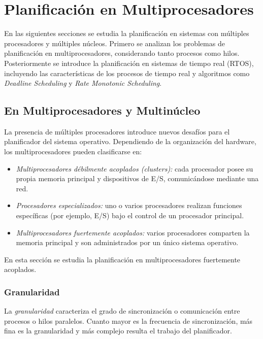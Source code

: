 \section{Planificación en Multiprocesadores}

En las siguientes secciones se estudia la planificación en sistemas con múltiples procesadores y múltiples núcleos. Primero se analizan los problemas de planificación en multiprocesadores, considerando tanto procesos como hilos. Posteriormente se introduce la planificación en sistemas de tiempo real (RTOS), incluyendo las características de los procesos de tiempo real y algoritmos como \textit{Deadline Scheduling} y \textit{Rate Monotonic Scheduling}.

\subsection{En Multiprocesadores y Multinúcleo}

La presencia de múltiples procesadores introduce nuevos desafíos para el planificador del sistema operativo. Dependiendo de la organización del hardware, los multiprocesadores pueden clasificarse en:
\begin{itemize}
  \item \textit{Multiprocesadores débilmente acoplados (clusters):} cada procesador posee su propia memoria principal y dispositivos de E/S, comunicándose mediante una red.
  \item \textit{Procesadores especializados:} uno o varios procesadores realizan funciones específicas (por ejemplo, E/S) bajo el control de un procesador principal.
  \item \textit{Multiprocesadores fuertemente acoplados:} varios procesadores comparten la memoria principal y son administrados por un único sistema operativo.
\end{itemize}

En esta sección se estudia la planificación en multiprocesadores fuertemente acoplados.

\subsubsection{Granularidad}

La \textit{granularidad} caracteriza el grado de sincronización o comunicación entre procesos o hilos paralelos. Cuanto mayor es la frecuencia de sincronización, más fina es la granularidad y más complejo resulta el trabajo del planificador.

